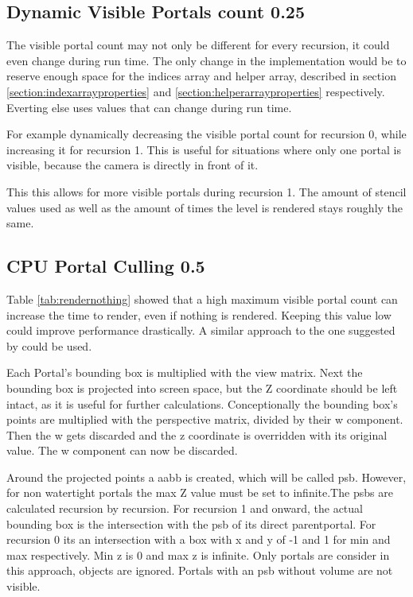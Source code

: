 \subsection{Dynamic Visible Portals count 0.25}
The visible portal count may not only be different for every recursion, it could even change during run time. The only change in the implementation would be to reserve enough space for the indices array and helper array, described in section \ref{section:indexarrayproperties} and \ref{section:helperarrayproperties} respectively. Everting else uses values that can change during run time.

For example dynamically decreasing the visible portal count for recursion 0, while increasing it for recursion 1. This is useful for situations where only one portal is visible, because the camera is directly in front of it.

This this allows for more visible portals during recursion 1. The amount of stencil values used as well as the amount of times the level is rendered stays roughly the same.

\subsection{CPU Portal Culling 0.5}
\label{section:cullingportals}
Table \ref{tab:rendernothing} showed that a high maximum visible portal count can increase the time to render, even if nothing is rendered. Keeping this value low could improve performance drastically. A similar approach to the one suggested by \cite{luebke:1995:portals} could be used.

Each Portal's bounding box is multiplied with the view matrix. Next the bounding box is projected into screen space, but the Z coordinate should be left intact, as it is useful for further calculations. Conceptionally the bounding box's points are multiplied with the perspective matrix, divided by their w component. Then the w gets discarded and the z coordinate is overridden with its original value. The w component can now be discarded.

Around the projected points a \gls{aabb} is created, which will be called \gls{psb}.  However, for non watertight portals the max Z value must be set to infinite.The \glspl{psb} are calculated recursion by recursion. For recursion 1 and onward, the actual bounding box is the intersection with the  \gls{psb} of its direct \gls{parentportal}. For recursion 0 its an intersection with a box with x and y of -1 and 1 for min and max respectively. Min z is 0 and max z is infinite. Only portals are consider in this approach, objects are ignored. Portals with an \gls{psb} without volume are not visible.

